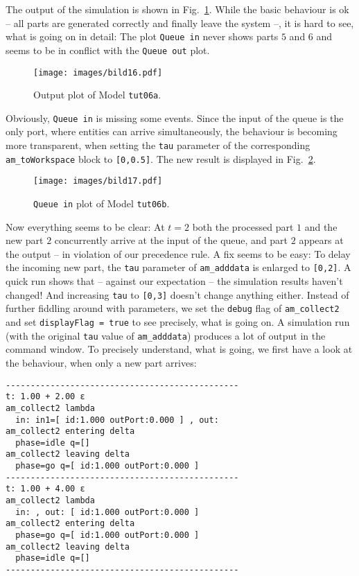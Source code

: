 \documentclass[12pt,oneside,a4paper,bibtotoc,BCOR=0pt,DIV=20]{scrreprt}
\newcommand{\cft}[1]{\mbox{\texttt{#1}}}   %
\begin{document}
The output of the simulation is shown in Fig.\ \ref{fig_16}. While the basic
behaviour is ok -- all parts are generated correctly and finally leave the
system --, it is hard to see, what is going on in detail: The plot \cft{Queue
  in} never shows parts $5$ and $6$ and seems to be in conflict with the
\cft{Queue out} plot.

\begin{figure}[ht]
\centering
\texttt{[image: images/bild16.pdf]}
\caption{Output plot of Model \cft{tut06a}.}
\label{fig_16}
\end{figure}

Obviously, \cft{Queue in} is missing some events. Since the input of the
queue is the only port, where entities can arrive simultaneously, the behaviour
is becoming more transparent, when setting the \cft{tau} parameter of the
corresponding \cft{am\_toWorkspace} block to \cft{[0,0.5]}. The new result is
displayed in Fig.\ \ref{fig_17}.

\begin{figure}[ht]
\centering
\texttt{[image: images/bild17.pdf]}
\caption{ \cft{Queue in} plot of Model \cft{tut06b}.}
\label{fig_17}
\end{figure}

Now everything seems to be clear: At $t = 2$ both the processed part $1$ and
the new part $2$ concurrently arrive at the input of the queue, and part $2$
appears at the output -- in violation of our precedence rule. A fix seems to be
easy: To delay the incoming new part, the \cft{tau} parameter of
\cft{am\_adddata} is enlarged to \cft{[0,2]}. A quick run shows that -- against
our expectation -- the simulation results haven't changed! And increasing
\cft{tau} to \cft{[0,3]} doesn't change anything either. Instead of further
fiddling around with parameters, we set the \cft{debug} flag of
\cft{am\_collect2} and set \cft{displayFlag = true} to see precisely, what is
going on. A simulation run (with the original \cft{tau} value of
\cft{am\_adddata}) produces a lot of output in the command window. To precisely
understand, what is going, we first have a look at the behaviour, when only a
new part arrives: 
\newpage
\begin{verbatim}
-----------------------------------------------
t: 1.00 + 2.00 ε
am_collect2 lambda
  in: in1=[ id:1.000 outPort:0.000 ] , out: 
am_collect2 entering delta
  phase=idle q=[] 
am_collect2 leaving delta
  phase=go q=[ id:1.000 outPort:0.000 ]
-----------------------------------------------
t: 1.00 + 4.00 ε
am_collect2 lambda
  in: , out: [ id:1.000 outPort:0.000 ]
am_collect2 entering delta
  phase=go q=[ id:1.000 outPort:0.000 ]
am_collect2 leaving delta
  phase=idle q=[] 
-----------------------------------------------
\end{verbatim}
\end{document}

